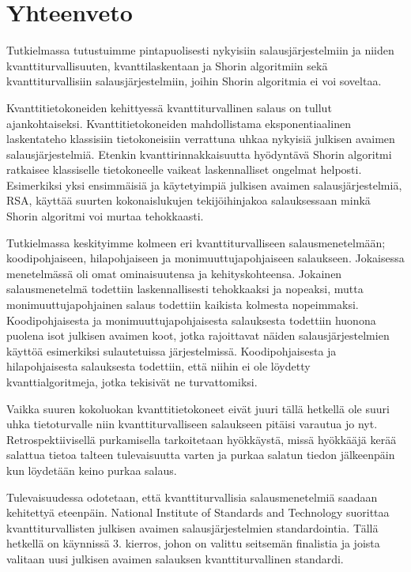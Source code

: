 \chapter{Yhteenveto\label{conclusions}}

Tutkielmassa tutustuimme pintapuolisesti nykyisiin salausjärjestelmiin ja niiden kvanttiturvallisuuten, kvanttilaskentaan ja Shorin algoritmiin sekä kvanttiturvallisiin salausjärjestelmiin, joihin Shorin algoritmia ei voi soveltaa.

Kvanttitietokoneiden kehittyessä kvanttiturvallinen salaus on tullut ajankohtaiseksi. Kvanttitietokoneiden mahdollistama eksponentiaalinen laskentateho klassisiin tietokoneisiin verrattuna uhkaa nykyisiä julkisen avaimen salausjärjestelmiä. Etenkin kvanttirinnakkaisuutta hyödyntävä Shorin algoritmi ratkaisee klassiselle tietokoneelle vaikeat laskennalliset ongelmat helposti. Esimerkiksi yksi ensimmäisiä ja käytetyimpiä julkisen avaimen salausjärjestelmiä, RSA, käyttää suurten kokonaislukujen tekijöihinjakoa salauksessaan minkä Shorin algoritmi voi murtaa tehokkaasti.

Tutkielmassa keskityimme kolmeen eri kvanttiturvalliseen salausmenetelmään; koodipohjaiseen, hilapohjaiseen ja monimuuttujapohjaiseen salaukseen. Jokaisessa menetelmässä oli omat ominaisuutensa ja kehityskohteensa. Jokainen salausmenetelmä todettiin laskennallisesti tehokkaaksi ja nopeaksi, mutta monimuuttujapohjainen salaus todettiin kaikista kolmesta nopeimmaksi. Koodipohjaisesta ja monimuuttujapohjaisesta salauksesta todettiin huonona puolena isot julkisen avaimen koot, jotka rajoittavat näiden salausjärjestelmien käyttöä esimerkiksi sulautetuissa järjestelmissä. Koodipohjaisesta ja hilapohjaisesta salauksesta todettiin, että niihin ei ole löydetty kvanttialgoritmeja, jotka tekisivät ne turvattomiksi.

Vaikka suuren kokoluokan kvanttitietokoneet eivät juuri tällä hetkellä ole suuri uhka tietoturvalle niin kvanttiturvalliseen salaukseen pitäisi varautua jo nyt. Retrospektiivisellä purkamisella tarkoitetaan hyökkäystä, missä hyökkääjä kerää salattua tietoa talteen tulevaisuutta varten ja purkaa salatun tiedon jälkeenpäin kun löydetään keino purkaa salaus.

Tulevaisuudessa odotetaan, että kvanttiturvallisia salausmenetelmiä saadaan kehitettyä eteenpäin. National Institute of Standards and Technology suorittaa kvanttiturvallisten julkisen avaimen salausjärjestelmien standardointia. Tällä hetkellä on käynnissä 3. kierros, johon on valittu seitsemän finalistia ja joista valitaan uusi julkisen avaimen salauksen kvanttiturvallinen standardi.